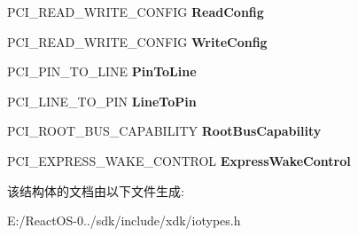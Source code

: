 \begin{DoxyCompactItemize}
P\+C\+I\+\_\+\+R\+E\+A\+D\+\_\+\+W\+R\+I\+T\+E\+\_\+\+C\+O\+N\+F\+IG {\bfseries Read\+Config}
\item 
\mbox{\label{struct___p_c_i___b_u_s___i_n_t_e_r_f_a_c_e___s_t_a_n_d_a_r_d_aa1b12ffd84b67192f5898bc160c8a585}} 
P\+C\+I\+\_\+\+R\+E\+A\+D\+\_\+\+W\+R\+I\+T\+E\+\_\+\+C\+O\+N\+F\+IG {\bfseries Write\+Config}
\item 
\mbox{\label{struct___p_c_i___b_u_s___i_n_t_e_r_f_a_c_e___s_t_a_n_d_a_r_d_a1abb64f631b39273649e0b544669f43a}} 
P\+C\+I\+\_\+\+P\+I\+N\+\_\+\+T\+O\+\_\+\+L\+I\+NE {\bfseries Pin\+To\+Line}
\item 
\mbox{\label{struct___p_c_i___b_u_s___i_n_t_e_r_f_a_c_e___s_t_a_n_d_a_r_d_a0ec227263096237dc593655d071d65db}} 
P\+C\+I\+\_\+\+L\+I\+N\+E\+\_\+\+T\+O\+\_\+\+P\+IN {\bfseries Line\+To\+Pin}
\item 
\mbox{\label{struct___p_c_i___b_u_s___i_n_t_e_r_f_a_c_e___s_t_a_n_d_a_r_d_a5509c4491c34683f377c9fd28d3e0607}} 
P\+C\+I\+\_\+\+R\+O\+O\+T\+\_\+\+B\+U\+S\+\_\+\+C\+A\+P\+A\+B\+I\+L\+I\+TY {\bfseries Root\+Bus\+Capability}
\item 
\mbox{\label{struct___p_c_i___b_u_s___i_n_t_e_r_f_a_c_e___s_t_a_n_d_a_r_d_a5a7986b4544fd4da5f25e46022ba4bed}} 
P\+C\+I\+\_\+\+E\+X\+P\+R\+E\+S\+S\+\_\+\+W\+A\+K\+E\+\_\+\+C\+O\+N\+T\+R\+OL {\bfseries Express\+Wake\+Control}
\end{DoxyCompactItemize}


该结构体的文档由以下文件生成\+:\begin{DoxyCompactItemize}
\item 
E\+:/\+React\+O\+S-\/0../sdk/include/xdk/iotypes.\+h\end{DoxyCompactItemize}

